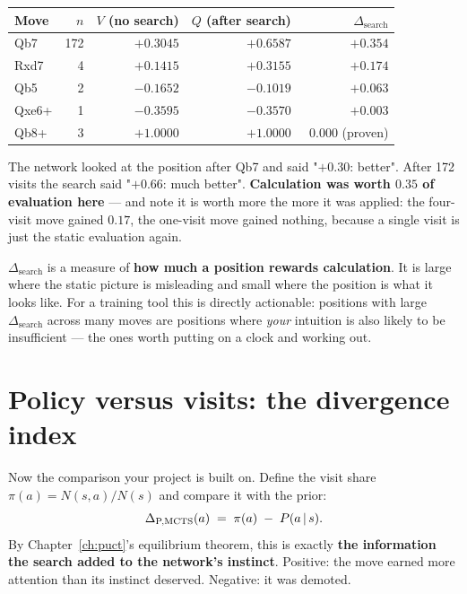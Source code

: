 \begin{realdata}[title={Real engine output: what search added, Morphy position}]
\begin{center}
\begin{tabular}{@{}lrrrr@{}}
\toprule
Move & $n$ & $V$ (no search) & $Q$ (after search) & $\Delta_{\text{search}}$ \\
\midrule
Qb7   & 172 & $+0.3045$ & $+0.6587$ & $\mathbf{+0.354}$ \\
Rxd7  &   4 & $+0.1415$ & $+0.3155$ & $+0.174$ \\
Qb5   &   2 & $-0.1652$ & $-0.1019$ & $+0.063$ \\
Qxe6+ &   1 & $-0.3595$ & $-0.3570$ & $+0.003$ \\
Qb8+  &   3 & $+1.0000$ & $+1.0000$ & $\ \ 0.000$ (proven) \\
\bottomrule
\end{tabular}
\end{center}
The network looked at the position after Qb7 and said "$+0.30$: better". After 172 visits the
search said "$+0.66$: much better". \textbf{Calculation was worth $0.35$ of evaluation here}
--- and note it is worth more the more it was applied: the four-visit move gained $0.17$, the
one-visit move gained nothing, because a single visit is just the static evaluation again.
\end{realdata}

\begin{keyidea}
$\Delta_{\text{search}}$ is a measure of \textbf{how much a position rewards calculation}. It
is large where the static picture is misleading and small where the position is what it looks
like. For a training tool this is directly actionable: positions with large
$\Delta_{\text{search}}$ across many moves are positions where \emph{your} intuition is also
likely to be insufficient --- the ones worth putting on a clock and working out.
\end{keyidea}

\section{Policy versus visits: the divergence index}

Now the comparison your project is built on. Define the visit share
$\pi(a) = N(s,a)/N(s)$ and compare it with the prior:
\begin{equation}
  \label{eq:divergence}
  \Delta_{\text{P,MCTS}}(a) \;=\; \pi(a) \;-\; P(a\,|\, s) .
\end{equation}
By Chapter~\ref{ch:puct}'s equilibrium theorem, this is exactly \textbf{the information the
search added to the network's instinct}. Positive: the move earned more attention than its
instinct deserved. Negative: it was demoted.

